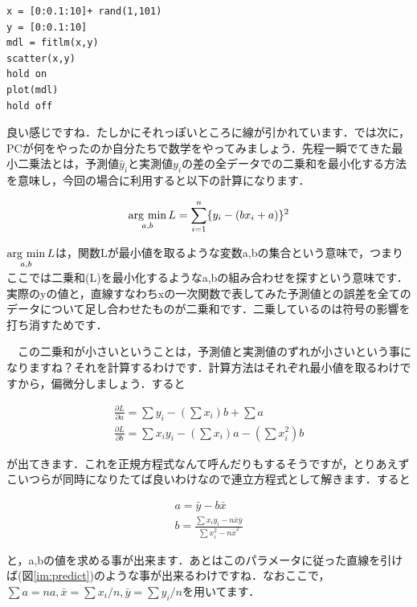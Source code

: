 \documentclass[11pt,a4paper,uplatex]{ujreport}
\newcommand{\argmin}{\mathop{\rm arg~min}\limits}
\begin{document}
\begin{lstlisting}[caption=単回帰のコード,label=sc:scatter]
x = [0:0.1:10]+ rand(1,101)
y = [0:0.1:10]
mdl = fitlm(x,y)
scatter(x,y)
hold on
plot(mdl)
hold off
\end{lstlisting}

良い感じですね．たしかにそれっぽいところに線が引かれています．では次に，PCが何をやったのか自分たちで数学をやってみましょう．先程一瞬でてきた最小二乗法とは，予測値$\hat y_i$と実測値$y_i$の差の全データでの二乗和を最小化する方法を意味し，今回の場合に利用すると以下の計算になります．

\begin{eqnarray}
\argmin_{a,b} L = \sum_{i=1}^n \{ y_i - (bx_i + a) \}^2
\end{eqnarray}

$\argmin_{a,b} L$は，関数Lが最小値を取るような変数a,bの集合という意味で，つまりここでは二乗和(L)を最小化するようなa,bの組み合わせを探すという意味です．実際のyの値と，直線すなわちxの一次関数で表してみた予測値との誤差を全てのデータについて足し合わせたものが二乗和です．二乗しているのは符号の影響を打ち消すためです．

　この二乗和が小さいということは，予測値と実測値のずれが小さいという事になりますね？それを計算するわけです．計算方法はそれぞれ最小値を取るわけですから，偏微分しましょう．すると

\begin{eqnarray}
\frac{\partial L}{\partial a} = \sum y_i -(\sum x_i)b + \sum a \\
\frac{\partial L}{\partial b} = \sum x_i y_i - (\sum x_i)a- (\sum x_i^2)b
\end{eqnarray}

が出てきます．これを正規方程式なんて呼んだりもするそうですが，とりあえずこいつらが同時になりたてば良いわけなので連立方程式として解きます．すると

\begin{eqnarray}
a = \bar y - b\bar x\\
b = \frac{\sum x_i y_i - n \bar{x} \bar{y}}{\sum x_i^2 - n\bar{x}^2}
\end{eqnarray}

と，a,bの値を求める事が出来ます．あとはこのパラメータに従った直線を引けば(図\ref{im:predict})のような事が出来るわけですね．なおここで，$\sum a = na, \bar x = \sum x_i/n, \bar y = \sum y_i/n$を用いてます．
\end{document}
